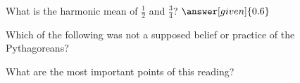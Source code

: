 \documentclass{ximera}
\begin{document}
\begin{question}
What is the harmonic mean of $\frac12$ and $\frac34$? $\answer[given]{0.6}$
\end{question}

\begin{question}
Which of the following was not a supposed belief or practice of the Pythagoreans?
\begin{multipleChoice}
\end{multipleChoice}
\end{question}


\begin{question}
What are the most important points of this reading?
\begin{freeResponse}
\end{freeResponse}
\end{question}
\end{document}
